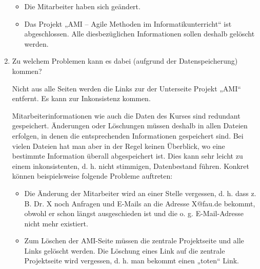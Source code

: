 \documentclass{lehramt-informatik-aufgabe}
\begin{document}
\begin{enumerate}
\begin{itemize}
\item Die Mitarbeiter haben sich geändert.
\item Das Projekt „AMI – Agile Methoden im Informatikunterricht“ ist
abgeschlossen. Alle diesbezüglichen Informationen sollen deshalb
gelöscht werden.
\end{itemize}

\item Zu welchem Problemen kann es dabei (aufgrund der Datenspeicherung)
kommen?

\begin{antwort}
Nicht aus alle Seiten werden die Links zur der Unterseite Projekt „AMI“
entfernt. Es kann zur Inkonsistenz kommen.

Mitarbeiterinformationen wie auch die Daten des Kurses sind redundant
gespeichert. Änderungen oder Löschungen müssen deshalb in allen Dateien
erfolgen, in denen die entsprechenden Informationen gespeichert sind.
Bei vielen Dateien hat man aber in der Regel keinen Überblick, wo eine
bestimmte Information überall abgespeichert ist. Dies kann sehr leicht
zu einem inkonsistenten, d. h. nicht stimmigen, Datenbestand führen.
Konkret können beispielsweise folgende Probleme auftreten:

\begin{itemize}
\item Die Änderung der Mitarbeiter wird an einer Stelle vergessen, d. h.
dass z. B. Dr. X noch Anfragen und E-Mails an die Adresse X@fau.de
bekommt, obwohl er schon längst ausgeschieden ist und die o. g.
E-Mail-Adresse nicht mehr existiert.

\item Zum Löschen der AMI-Seite müssen die zentrale Projektseite und
alle Links gelöscht werden. Die Löschung eines Link auf die zentrale
Projektseite wird vergessen, d. h. man bekommt einen „toten“ Link.
\end{itemize}
\end{antwort}
\end{enumerate}
\end{document}
